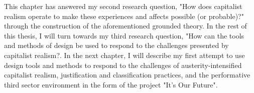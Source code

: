This chapter has answered my second research question, "How does capitalist realism operate to make these experiences and affects possible (or probable)?" through the construction of the aforementioned grounded theory. In the rest of this thesis, I will turn towards my third research question, "How can the tools and methods of design be used to respond to the challenges presented by capitalist realism?. In the next chapter, I will describe my first attempt to use design tools and methods to respond to the challenges of austerity-intensified capitalist realism, justification and classification practices, and the performative third sector environment in the form of the project "It's Our Future". 

